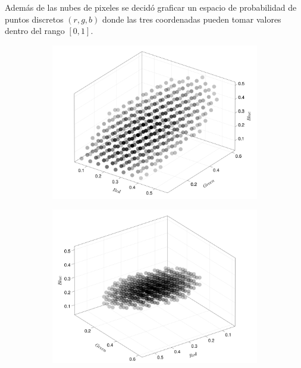 Además de las nubes de pixeles se decidó graficar un espacio de probabilidad de puntos discretos $(r,g,b)$ donde las tres coordenadas pueden tomar valores dentro del rango $[0,1]$.
\begin{figure}[ht!]
    \centering
    \begin{subfigure}[c]{0.3\textwidth}
        \centering
        \includegraphics[scale=0.09]{../pictures/gaussian_cloud_akira_1}
    \end{subfigure}
    \begin{subfigure}[c]{0.3\textwidth}
        \centering
        \includegraphics[scale=0.09]{../pictures/gaussian_cloud_akira_2}
    \end{subfigure}
    \begin{subfigure}[c]{0.3\textwidth}

\end{subfigure}
\end{figure}

